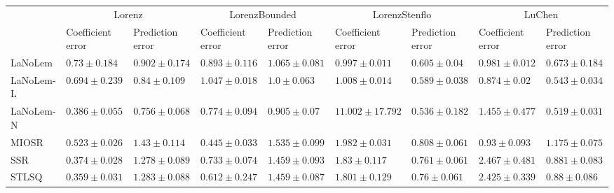 \begin{table*}
{\begin{tabular}{lllllllll}
 & \multicolumn{2}{c}{Lorenz} & \multicolumn{2}{c}{LorenzBounded} & \multicolumn{2}{c}{LorenzStenflo} & \multicolumn{2}{c}{LuChen} \\
 & Coefficient error & Prediction error & Coefficient error & Prediction error & Coefficient error & Prediction error & Coefficient error & Prediction error \\
\midrule
LaNoLem & $0.73\pm 0.184$ & $0.902\pm 0.174$ & $0.893\pm 0.116$ & $1.065\pm 0.081$ & $\mathbf{0.997}\pm 0.011$ & $0.605\pm 0.04$ & $0.981\pm 0.012$ & $0.673\pm 0.184$ \\
LaNoLem-L & $0.694\pm 0.239$ & $0.84\pm 0.109$ & $1.047\pm 0.018$ & $1.0\pm 0.063$ & $1.008\pm 0.014$ & $0.589\pm 0.038$ & $\mathbf{0.874}\pm 0.02$ & $0.543\pm 0.034$ \\
LaNoLem-N & $0.386\pm 0.055$ & $\mathbf{0.756}\pm 0.068$ & $0.774\pm 0.094$ & $\mathbf{0.905}\pm 0.07$ & $11.002\pm 17.792$ & $\mathbf{0.536}\pm 0.182$ & $1.455\pm 0.477$ & $\mathbf{0.519}\pm 0.031$ \\
MIOSR & $0.523\pm 0.026$ & $1.43\pm 0.114$ & $\mathbf{0.445}\pm 0.033$ & $1.535\pm 0.099$ & $1.982\pm 0.031$ & $0.808\pm 0.061$ & $0.93\pm 0.093$ & $1.175\pm 0.075$ \\
SSR & $0.374\pm 0.028$ & $1.278\pm 0.089$ & $0.733\pm 0.074$ & $1.459\pm 0.093$ & $1.83\pm 0.117$ & $0.761\pm 0.061$ & $2.467\pm 0.481$ & $0.881\pm 0.083$ \\
STLSQ & $\mathbf{0.359}\pm 0.031$ & $1.283\pm 0.088$ & $0.612\pm 0.247$ & $1.459\pm 0.087$ & $1.801\pm 0.129$ & $0.76\pm 0.061$ & $2.425\pm 0.339$ & $0.88\pm 0.086$ \\

\midrule


\end{tabular}}
\end{table*}
